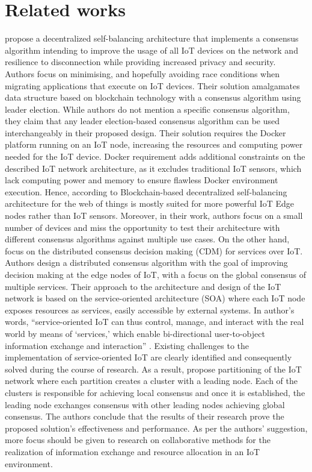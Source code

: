 \documentclass[oneside,12pt]{book}
\begin{document}
\section{Related works}
\cite{10.1007/978-3-030-30278-8_34} propose a decentralized self-balancing architecture that implements a consensus algorithm intending to improve the usage of all IoT devices on the network and resilience to disconnection while providing increased privacy and security. Authors focus on minimising, and hopefully avoiding race conditions when migrating applications that execute on IoT devices. Their solution amalgamates data structure based on blockchain technology with a consensus algorithm using leader election. While authors do not mention a specific consensus algorithm, they claim that any leader election-based consensus algorithm can be used interchangeably in their proposed design. Their solution requires the Docker platform running on an IoT node, increasing the resources and computing power needed for the IoT device. Docker requirement adds additional constraints on the described IoT network architecture, as it excludes traditional IoT sensors, which lack computing power and memory to ensure flawless Docker environment execution. Hence, according to \cite{10.1007/978-3-030-30278-8_34} Blockchain-based decentralized self-balancing architecture for the web of things is mostly suited for more powerful IoT Edge nodes rather than IoT sensors. Moreover, in their work, authors focus on a small number of devices and miss the opportunity to test their architecture with different consensus algorithms against multiple use cases.\smallskip \newline
On the other hand, \cite{6740862} focus on the distributed consensus decision making (CDM) for services over IoT. Authors design a distributed consensus algorithm with the goal of improving decision making at the edge nodes of IoT, with a focus on the global consensus of multiple services. Their approach to the architecture and design of the IoT network is based on the service-oriented architecture (SOA) where each IoT node exposes resources as services, easily accessible by external systems. In author’s words, “service-oriented IoT can thus control, manage, and interact with the real world by means of ‘services,’ which enable bi-directional user-to-object information exchange and interaction” \citep{6740862}. Existing challenges to the implementation of service-oriented IoT are clearly identified and consequently solved during the course of research. As a result, \cite{6740862} propose partitioning of the IoT network where each partition creates a cluster with a leading node. Each of the clusters is responsible for achieving local consensus and once it is established, the leading node exchanges consensus with other leading nodes achieving global consensus. The authors conclude that the results of their research prove the proposed solution’s effectiveness and performance. As per the authors’ suggestion, more focus should be given to research on collaborative methods for the realization of information exchange and resource allocation in an IoT environment.\smallskip \newline
\end{document}
